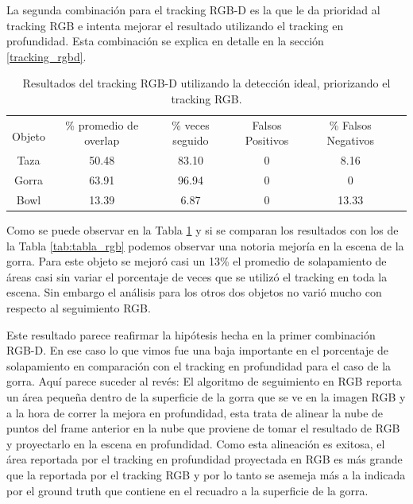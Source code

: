 La segunda combinación para el tracking RGB-D es la que le da prioridad al tracking RGB e intenta mejorar el resultado utilizando el tracking en profundidad. Esta combinación se explica en detalle en la sección \ref{tracking_rgbd}.

\begin{table}[h]
	\centering
    \begin{tabular}{|c|c|c|c|c|c|}
    \hline
    & \multirow{2}{2.4cm}{\% promedio de overlap} & \multirow{2}{2cm}{\% veces seguido} & \multirow{2}{1.6cm}{Falsos Positivos} & \multirow{2}{1.6cm}{\% Falsos Negativos}\\
	Objeto & & & &\\
    \hline
    Taza   & 50.48      & 83.10     & 0      & 8.16  \\
    \hline
    Gorra  & 63.91      & 96.94     & 0      & 0     \\
    \hline
    Bowl   & 13.39      &  6.87     & 0      & 13.33 \\
    \hline
    \end{tabular}
\caption{Resultados del tracking RGB-D utilizando la detección ideal, priorizando el tracking RGB.}
\label{tabla_rgbd_rgb}
\end{table}


Como se puede observar en la Tabla \ref{tabla_rgbd_rgb} y si se comparan los resultados con los de la Tabla \ref{tab:tabla_rgb} podemos observar una notoria mejoría en la escena de la gorra. Para este objeto se mejoró casi un 13\% el promedio de solapamiento de áreas casi sin variar el porcentaje de veces que se utilizó el tracking en toda la escena. Sin embargo el análisis para los otros dos objetos no varió mucho con respecto al seguimiento RGB.


Este resultado parece reafirmar la hipótesis hecha en la primer combinación RGB-D. En ese caso lo que vimos fue una baja importante en el porcentaje de solapamiento en comparación con el tracking en profundidad para el caso de la gorra. Aquí parece suceder al revés: El algoritmo de seguimiento en RGB reporta un área pequeña dentro de la superficie de la gorra que se ve en la imagen RGB y a la hora de correr la mejora en profundidad, esta trata de alinear la nube de puntos del frame anterior en la nube que proviene de tomar el resultado de RGB y proyectarlo en la escena en profundidad. Como esta alineación es exitosa, el área reportada por el tracking en profundidad proyectada en RGB es más grande que la reportada por el tracking RGB y por lo tanto se asemeja más a la indicada por el ground truth que contiene en el recuadro a la superficie de la gorra.




